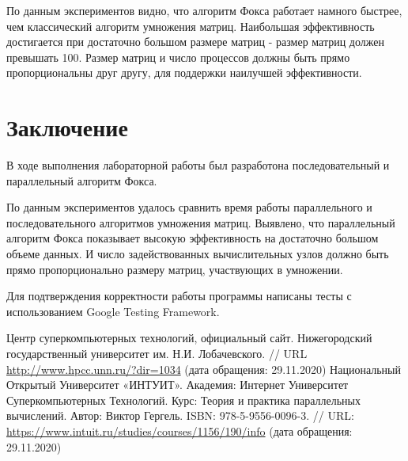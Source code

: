 \documentclass{report}
\begin{document}
\par По данным экспериментов видно, что алгоритм Фокса работает намного быстрее, чем
классический алгоритм умножения матриц. Наибольшая эффективность достигается при
достаточно большом размере матриц - размер матриц должен превышать 100. Размер матриц и число процессов должны быть прямо пропорциональны друг другу, для поддержки наилучшей эффективности.
\newpage

\section*{Заключение}
В ходе выполнения лабораторной работы был разработона последовательный и параллельный алгоритм Фокса.
\par По данным экспериментов удалось сравнить время работы параллельного и последовательного алгоритмов умножения матриц. Выявлено, что параллельный алгоритм Фокса показывает высокую эффективность на достаточно большом объеме данных. И число задействованных вычислительных узлов должно быть прямо пропорционально размеру матриц, участвующих в умножении.
\par Для подтверждения корректности работы программы написаны тесты с использованием Google Testing Framework.
\newpage

\begin{thebibliography}{1}
 Центр суперкомпьютерных технологий, официальный сайт. Нижегородский
государственный университет им. Н.И. Лобачевского.  // URL \url {http://www.hpcc.unn.ru/?dir=1034} (дата обращения: 29.11.2020)
 Национальный Открытый Университет «ИНТУИТ». Академия: Интернет Университет Суперкомпьютерных Технологий. Курс: Теория и практика параллельных вычислений. Автор: Виктор Гергель. ISBN: 978-5-9556-0096-3. // URL: \url {https://www.intuit.ru/studies/courses/1156/190/info} (дата обращения: 29.11.2020)
\end{thebibliography}
\newpage

\end{document}
